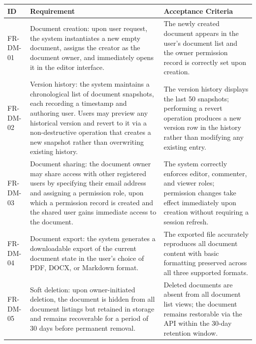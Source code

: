 \documentclass{article}
\begin{document}
\noindent
{\small
\begin{tabularx}{\textwidth}{|>{\hsize=0.4\hsize\raggedright\arraybackslash}X|>{\hsize=1.3\hsize\raggedright\arraybackslash}X|>{\hsize=1.3\hsize\raggedright\arraybackslash}X|}
    \hline
    \rowcolor{tableBlue} 
    \textbf{\color{white}ID} & 
    \textbf{\color{white}Requirement} & 
    \textbf{\color{white}Acceptance Criteria} \\
    \hline
    FR-DM-01 &
    Document creation: upon user request, the system instantiates a new empty document, assigns the creator as the document owner, and immediately opens it in the editor interface. &
    The newly created document appears in the user's document list and the owner permission record is correctly set upon creation. \\
    \hline
    FR-DM-02 &
    Version history: the system maintains a chronological list of document snapshots, each recording a timestamp and authoring user. Users may preview any historical version and revert to it via a non-destructive operation that creates a new snapshot rather than overwriting existing history. &
    The version history displays the last 50 snapshots; performing a revert operation produces a new version row in the history rather than modifying any existing entry. \\
    \hline
    FR-DM-03 &
    Document sharing: the document owner may share access with other registered users by specifying their email address and assigning a permission role, upon which a permission record is created and the shared user gains immediate access to the document. &
    The system correctly enforces editor, commenter, and viewer roles; permission changes take effect immediately upon creation without requiring a session refresh. \\
    \hline
    FR-DM-04 &
    Document export: the system generates a downloadable export of the current document state in the user's choice of PDF, DOCX, or Markdown format. &
    The exported file accurately reproduces all document content with basic formatting preserved across all three supported formats. \\
    \hline
    FR-DM-05 &
    Soft deletion: upon owner-initiated deletion, the document is hidden from all document listings but retained in storage and remains recoverable for a period of 30 days before permanent removal. &
    Deleted documents are absent from all document list views; the document remains restorable via the API within the 30-day retention window. \\
    \hline
\end{tabularx}
}
\end{document}
